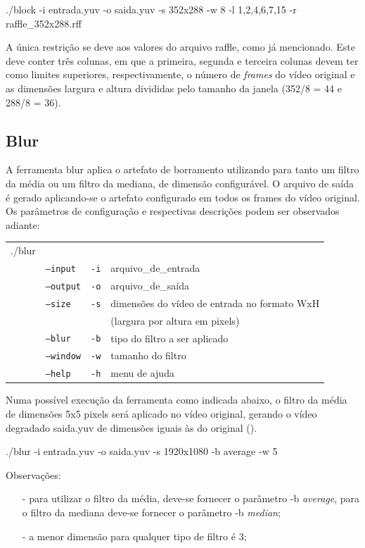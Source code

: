 ./block -i entrada.yuv -o saida.yuv -s 352x288 -w 8 -l 1,2,4,6,7,15 -r raffle\_352x288.rff

A única restrição se deve aos valores do arquivo raffle, como já mencionado. Este deve conter três colunas, em que a primeira, segunda e terceira colunas devem ter como limites superiores, respectivamente, o número de \emph{frames} do vídeo original e as dimensões largura e altura divididas pelo tamanho da janela (352/8 = 44 e 288/8 = 36).

\subsection{Blur}

A ferramenta blur aplica o artefato de borramento utilizando para tanto um filtro da média ou um filtro da mediana, de dimensão configurável. O arquivo de saída é gerado aplicando-se o artefato configurado em todos os frames do vídeo original. Os parâmetros de configuração e respectivas descrições podem ser observados adiante:

\begin{table}[!h]
	\begin{tabular}{llll}
	./blur & & \\ 
	& \texttt{--input} & \texttt{-i}  & arquivo\_de\_entrada \\
	& \texttt{--output} & \texttt{-o}  & arquivo\_de\_saída \\
	& \texttt{--size} & \texttt{-s}  & dimensões do vídeo de entrada no formato WxH \\ 
	& & & (largura por altura em pixels) \\
	& \texttt{--blur} & \texttt{-b}  & tipo do filtro a ser aplicado \\
	& \texttt{--window} & \texttt{-w}  & tamanho do filtro \\
	& \texttt{--help} & \texttt{-h}  & menu de ajuda \\
	\end{tabular}
\end{table}

Numa possível execução da ferramenta como indicada abaixo, o filtro da média de dimensões 5x5 pixels será aplicado no vídeo original, gerando o vídeo degradado saida.yuv de dimensões iguais às do original ().

./blur -i entrada.yuv -o saida.yuv -s 1920x1080 -b average -w 5

Observações:
\begin{itemize}
    \item[-] para utilizar o filtro da média, deve-se fornecer o parâmetro -b \emph{average}, para o filtro da mediana deve-se fornecer o parâmetro -b \emph{median};
    \item[-] a menor dimensão para qualquer tipo de filtro é 3;
\end{itemize}

